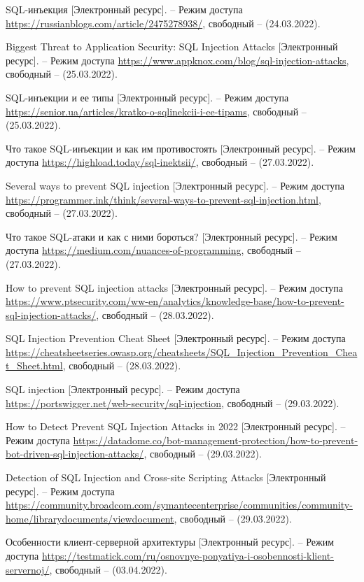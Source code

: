 \begin{thebibliography}{}
	SQL-инъекция [Электронный ресурс]. – Режим доступа \url{https://russianblogs.com/article/2475278938/}, свободный – (24.03.2022).
	
	Biggest Threat to Application Security: SQL Injection Attacks [Электронный ресурс]. – Режим доступа \url{https://www.appknox.com/blog/sql-injection-attacks}, свободный – (25.03.2022).	
	
	SQL-инъекции и ее типы [Электронный ресурс]. – Режим доступа \url{https://senior.ua/articles/kratko-o-sqlinekcii-i-ee-tipams}, свободный – (25.03.2022).		
	
	Что такое SQL-инъекции и как им противостоять [Электронный ресурс]. – Режим доступа \url{https://highload.today/sql-inektsii/}, свободный – (27.03.2022).	
	
	Several ways to prevent SQL injection [Электронный ресурс]. – Режим доступа \url{https://programmer.ink/think/several-ways-to-prevent-sql-injection.html}, свободный – (27.03.2022).	
	
	Что такое SQL-атаки и как с ними бороться? [Электронный ресурс]. – Режим доступа \url{https://medium.com/nuances-of-programming}, свободный – (27.03.2022).		
	
	How to prevent SQL injection attacks [Электронный ресурс]. – Режим доступа \url{https://www.ptsecurity.com/ww-en/analytics/knowledge-base/how-to-prevent-sql-injection-attacks/}, свободный – (28.03.2022).	
	
	SQL Injection Prevention Cheat Sheet [Электронный ресурс]. – Режим доступа \url{https://cheatsheetseries.owasp.org/cheatsheets/SQL_Injection_Prevention_Cheat_Sheet.html}, свободный – (28.03.2022).	
	
	SQL injection [Электронный ресурс]. – Режим доступа \url{https://portswigger.net/web-security/sql-injection}, свободный – (29.03.2022).	
	
	How to Detect Prevent SQL Injection Attacks in 2022 [Электронный ресурс]. – Режим доступа \url{https://datadome.co/bot-management-protection/how-to-prevent-bot-driven-sql-injection-attacks/}, свободный – (29.03.2022).	
	
	Detection of SQL Injection and Cross-site Scripting Attacks [Электронный ресурс]. – Режим доступа \url{https://community.broadcom.com/symantecenterprise/communities/community-home/librarydocuments/viewdocument}, свободный – (29.03.2022).		

	Особенности клиент-серверной архитектуры [Электронный ресурс]. – Режим доступа \url{https://testmatick.com/ru/osnovnye-ponyatiya-i-osobennosti-klient-servernoj/}, свободный – (03.04.2022).	


	
\end{thebibliography}
\endgroup

\pagebreak